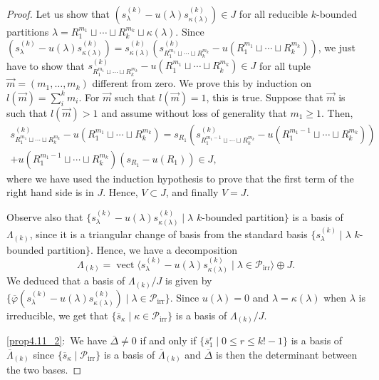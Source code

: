 \documentclass[ALCO,ThmDefs,Unicode,epreuves]{cedram}
\DeclareMathOperator{\irr}{irr}
\DeclareMathOperator{\vect}{vect}
\begin{document}
\begin{proof}
Let us show that $(s_{\lambda}^{(k)}-u(\lambda)s_{\kappa(\lambda)}^{(k)})\in J$ for all reducible $k$-bounded partitions $\lambda=R_{1}^{m_{1}}%
\sqcup\cdots\sqcup R_{k}^{m_{k}}\sqcup\kappa(\lambda)$. Since $(s_{\lambda}^{(k)}-u(\lambda)s_{\kappa(\lambda)}^{(k)})=s_{\kappa(\lambda)}^{(k)}(s_{R_{1}^{m_{1}}%
\sqcup\cdots\sqcup R_{k}^{m_{k}}}^{(k)}-u(R_{1}^{m_{1}}%
\sqcup\cdots\sqcup R_{k}^{m_{k}}))$, we just have to show that $s_{R_{1}^{m_{1}}%
\sqcup\cdots\sqcup R_{k}^{m_{k}}}^{(k)}-u(R_{1}^{m_{1}}%
\sqcup\cdots\sqcup R_{k}^{m_{k}})\in J$ for all tuple $\vec{m}=(m_{1},\ldots,m_{k})$ different from zero. We prove this by induction on $l(\vec{m})=\sum_{i}^k m_{i}$. For $\vec{m}$ such that $l(\vec{m})=1$, this is true. Suppose that $\vec{m}$ is such that $l(\vec{m})>1$ and assume without loss of generality that $m_{1}\geq 1$. Then,
\begin{multline*}
s_{R_{1}^{m_{1}}%
\sqcup\cdots\sqcup R_{k}^{m_{k}}}^{(k)} -u(R_{1}^{m_{1}}%
\sqcup\cdots\sqcup R_{k}^{m_{k}})=s_{R_{1}} (s_{R_{1}^{m_{1}-1}%
\sqcup\cdots\sqcup R_{k}^{m_{k}}}^{(k)} -u(R_{1}^{m_{1}-1}%
\sqcup\cdots\sqcup R_{k}^{m_{k}}))\\
+u(R_{1}^{m_{1}-1}%
\sqcup\cdots\sqcup R_{k}^{m_{k}})(s_{R_{1}}-u(R_{1}))\in J,
\end{multline*}
where we have used the induction hypothesis to prove that the first term of the right hand side is in $J$. Hence, $V\subset J$, and finally $V=J$.

Observe also that $\{s_{\lambda}^{(k)}-u(\lambda)s_{\kappa(\lambda)}^{(k)}\mid\lambda$ $k$-bounded partition$\}$ is a basis of $\Lambda_{(k)}$, since it is a triangular change of basis from the standard basis $\{ s_{\lambda}^{(k)}\mid \lambda$ $k$-bounded partition$\}$. Hence, we have a decomposition 
\[
\Lambda_{(k)}=\vect \langle s_{\lambda}^{(k)}-u(\lambda)s_{\kappa(\lambda)}^{(k)}\mid\lambda\in \mathcal{P}_{\irr }\rangle\oplus J.
\]
We deduced that a basis of $\Lambda_{(k)}/J$ is given by $\{ \overline{\varphi}(s_{\lambda}^{(k)}-u(\lambda)s_{\kappa(\lambda)}^{(k)})\mid\lambda\in\mathcal{P}_{\irr }\}$. Since $u(\lambda)=0$ and $\lambda=\kappa(\lambda)$ when $\lambda$ is irreducible, we get that $\{ \overline{s}_{\kappa}\mid\kappa\in\mathcal{P}_{\irr }\}$ is a basis of $\Lambda_{(k)}/J$.

\eqref{prop4.11_2}:~We have $\overline{\Delta}\neq0$ if and only if $\{\overline{s}_{1}^{r}%
\mid0\leq r\leq k!-1\}$ is a basis of $\overline{\Lambda}_{(k)}$ since
$\{\overline{s}_{\kappa}\mid\mathcal{P}_{\irr }\}$ is a basis of
$\overline{\Lambda}_{(k)}$ and $\overline{\Delta}$ is then the determinant
between the two bases.
\end{proof}
\end{document}
